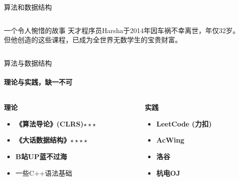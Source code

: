 \documentclass{beamer}
\begin{document}
\begin{frame}{算法和数据结构}
\begin{columns}[T]
\begin{column}{0.6\textwidth}
\begin{itemize}
\begin{itemize}
                \end{itemize}
                    \begin{alertblock}{一个令人惋惜的故事}
                        天才程序员Harsha于2014年因车祸不幸离世，年仅32岁。\\
                        但他创造的这些课程，已成为全世界无数学生的宝贵财富。\\
                        \vspace{0.3cm}
                    \end{alertblock}
            \end{itemize}
        \end{column}
    \end{columns}
\end{frame}

\begin{frame}{算法与数据结构}
    \framesubtitle{理论与实践，缺一不可}
    
    \begin{columns}[T]
        \begin{column}{0.5\textwidth}
            \Large\textbf{理论}
            \vspace{0.3cm}
            
            \begin{itemize}
                \item \textbf{《算法导论》(CLRS)$\star \star \star$}
                \item \textbf{《大话数据结构》$\star \star \star \star$}
                \item \textbf{B站UP蓝不过海}
                \item 一些C++语法基础
            \end{itemize}
        \end{column}
        
        \begin{column}{0.5\textwidth}
            \Large\textbf{实践}
            \vspace{0.3cm}
            
            \begin{itemize}
                \item  \textbf{LeetCode (力扣)} \\
                \item \textbf{AcWing} \\
                \item  \textbf{洛谷} \\
                \item \textbf{杭电OJ} \\
            \end{itemize}
        \end{column}
    \end{columns}


\end{frame}
\end{document}
